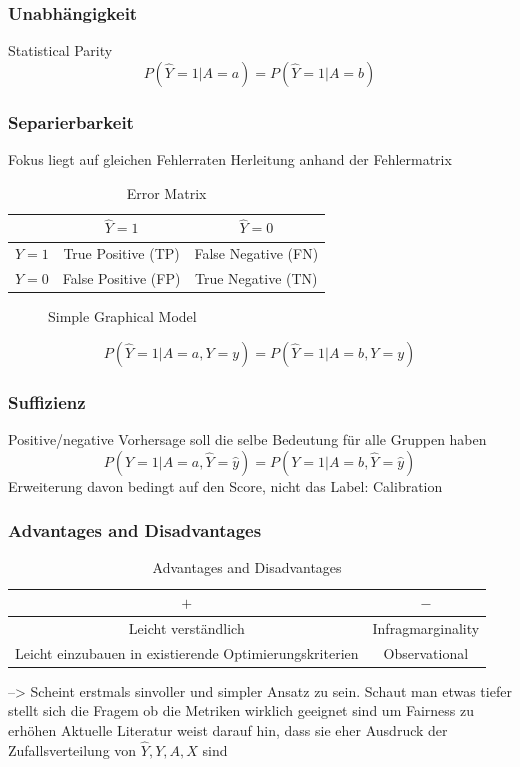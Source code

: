 \documentclass[aspectratio=169]{beamer}
\begin{document}
\begin{frame}
	\frametitle{Unabhängigkeit}
	Statistical Parity
	$$P(\hat{Y} = 1 | A = a) = P(\hat{Y} = 1 | A = b)$$
\end{frame}

\begin{frame}
	\frametitle{Separierbarkeit}
	Fokus liegt auf gleichen Fehlerraten
	Herleitung anhand der Fehlermatrix
	\begin{table}[H]
	\centering
	\begin{tabular}{c|c|c}
	\toprule
	 & $\hat{Y} = 1$ & $\hat{Y} = 0$ \\
	\midrule
	$Y = 1$ & True Positive (TP) & False Negative (FN) \\
	$Y = 0$ & False Positive (FP) & True Negative (TN) \\
	\bottomrule
	\end{tabular}
	\caption{Error Matrix}
	\end{table}
	\begin{figure}[H]
	\centering
	\caption{Simple Graphical Model}
	\end{figure}
	$$P(\hat{Y} = 1 | A = a, Y = y) = P(\hat{Y} = 1 | A = b, Y = y)$$
\end{frame}

\begin{frame}
	\frametitle{Suffizienz}
	Positive/negative Vorhersage soll die selbe Bedeutung für alle Gruppen haben
	$$P(Y = 1 | A = a, \hat{Y} = \hat{y}) = P(Y = 1 | A = b, \hat{Y} = \hat{y})$$
	Erweiterung davon bedingt auf den Score, nicht das Label: Calibration
\end{frame}
\begin{frame}
	\frametitle{Advantages and Disadvantages}
	\begin{table}[H]
	\centering
	\begin{tabular}{c|c}
	\toprule
	$+$ & $-$ \\
	\midrule
	Leicht verständlich & Infragmarginality \\
	Leicht einzubauen in existierende Optimierungskriterien & Observational \\
	\bottomrule
	\end{tabular}
	\caption{Advantages and Disadvantages}
	\end{table}
	--> Scheint erstmals sinvoller und simpler Ansatz zu sein. Schaut man etwas tiefer stellt sich
	die Fragem ob die Metriken wirklich geeignet sind um Fairness zu erhöhen
	Aktuelle Literatur weist darauf hin, dass sie eher Ausdruck der Zufallsverteilung
	von $\hat{Y}, Y, A, X$ sind
\end{frame}
\end{document}
